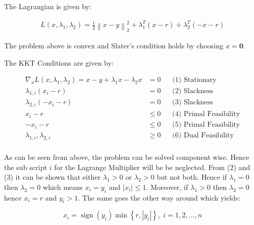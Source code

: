 \documentclass[]{article}
\DeclareMathOperator{\sign}{sign}
\newcommand{\MyParen}[1]{\left( #1 \right)}
\newcommand{\MyBrace}[1]{\left\lbrace #1 \right\rbrace}
\newcommand{\MyNormSqr}[2]{{\left\| #1 \right\|}_{#2}^{2}}
\newcommand{\MyAbs}[1]{\left| #1 \right|}
\newcommand{\MyNormTwoSqr}[1]{\MyNormSqr{#1}{2}}
\begin{document}
	The Lagrangian is given by:
	
	\begin{align*}
	L \MyParen{x, {\lambda}_{1}, {\lambda}_{2}} = \frac{1}{2} \MyNormTwoSqr{ x - y } + {\lambda}_{1}^{T} \MyParen{ x - r } + {\lambda}_{2}^{T} \MyParen{ -x - r }
	\end{align*}
	
	The problem above is convex and Slater's condition holds by choosing $ x = \boldsymbol{0} $.
	
	The KKT Conditions are given by:
	
	\begin{align*}
	{\nabla}_{x} L \MyParen{x, {\lambda}_{1}, {\lambda}_{2}} = x - y + {\lambda}_{1} x - {\lambda}_{2} x & = 0 && \text{(1) Stationary} \\
	{\lambda}_{1, i} \MyParen{ {x}_{i}  - r} 	& = 0 		&& \text{(2) Slackness} \\
	{\lambda}_{2, i} \MyParen{ -{x}_{i}  - r} 	& = 0 		&& \text{(3) Slackness} \\
	{x}_{i}  - r						& \leq 0 	&& \text{(4) Primal Feasibility} \\
	-{x}_{i}  - r						& \leq 0 	&& \text{(5) Primal Feasibility} \\
	{\lambda}_{1, i}, {\lambda}_{2, i} 							& \geq 0 	&& \text{(6) Dual Feasibility} \\
	\end{align*}
	
	As can be seen from above, the problem can be solved component wise. Hence the sub script $ i $ for the Lagrange Multiplier will be be neglected. From (2) and (3) it can be shown that either $ {\lambda}_{1} > 0 $ or $ {\lambda}_{2} > 0 $ but not both. Hence if $ {\lambda}_{1} = 0 $ then $ {\lambda}_{2} = 0 $ which means $ {x}_{i} = {y}_{i} $ and $ \MyAbs{ {x}_{i} } \leq 1 $.  Moreover, if $  {\lambda}_{1} > 0 $ then $ {\lambda}_{2} = 0 $ hence $ {x}_{i} = r $ and $ {y}_{i} > 1 $. The same goes the other way around which yields:
	
	$$ {x}_{i} = \sign \MyParen{ {y}_{i} } \min \MyBrace{ r, \MyAbs{ {y}_{i} } }, \; i = 1, 2, \ldots, n $$
	
\end{document}
